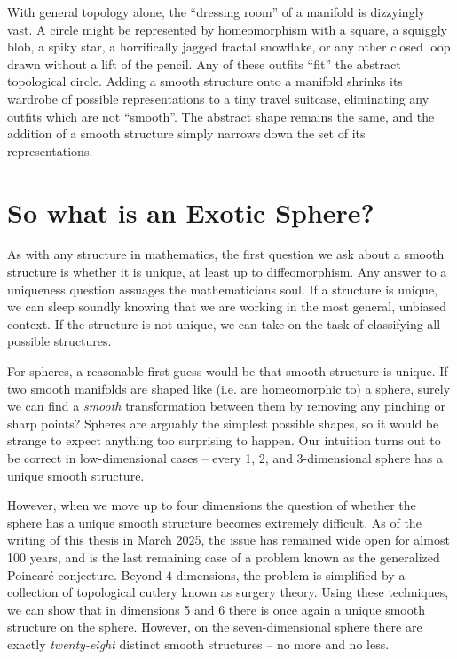 With general topology alone, the ``dressing room'' of a manifold is dizzyingly vast.
A circle might be represented by homeomorphism with a square, a squiggly blob, a spiky star, a horrifically jagged fractal snowflake, or any other closed loop drawn without a lift of the pencil. Any of these outfits ``fit'' the abstract topological circle.
Adding a smooth structure onto a manifold shrinks its wardrobe of possible representations to a tiny travel suitcase, eliminating any outfits which are not ``smooth''. The abstract shape remains the same, and the addition of a smooth structure simply narrows down the set of its representations.

\section*{So what is an Exotic Sphere?}

As with any structure in mathematics, the first question we ask about a smooth structure is whether it is unique, at least up to diffeomorphism. Any answer to a uniqueness question assuages the mathematicians soul. If a structure is unique, we can sleep soundly knowing that we are working in the most general, unbiased context. If the structure is not unique, we can take on the task of classifying all possible structures.

For spheres, a reasonable first guess would be that smooth structure is unique. If two smooth manifolds are shaped like (i.e. are homeomorphic to) a sphere, surely we can find a \emph{smooth} transformation between them by removing any pinching or sharp points? Spheres are arguably the simplest possible shapes, so it would be strange to expect anything too surprising to happen. Our intuition turns out to be correct in low-dimensional cases -- every 1, 2, and 3-dimensional sphere has a unique smooth structure. 

However, when we move up to four dimensions the question of whether the sphere has a unique smooth structure becomes extremely difficult. As of the writing of this thesis in March 2025, the issue has remained wide open for almost 100 years, and is the last remaining case of a problem known as the generalized Poincar\'e conjecture. Beyond $4$ dimensions, the problem is simplified by a collection of topological cutlery known as surgery theory.
Using these techniques, we can show that in dimensions 5 and 6 there is once again a unique smooth structure on the sphere. However, on the seven-dimensional sphere there are exactly \emph{twenty-eight} distinct smooth structures -- no more and no less. 

